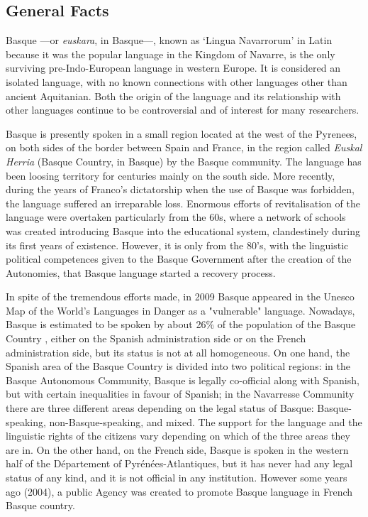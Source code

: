 \clearpage


\begin{multicols}{2}

\subsection{General Facts}
    Basque —or \textit{euskara}, in Basque—, known as ‘Lingua Navarrorum’ in Latin because it was the popular language in the Kingdom of Navarre, is the only surviving pre-Indo-European language in western Europe. It is considered an isolated language, with no known connections with other languages other than ancient Aquitanian. Both the origin of the language and its relationship with other languages continue to be controversial and of interest for many researchers.

Basque is presently spoken in a small region located at the west of the Pyrenees, on both sides of the border between Spain and France, in the region called \textit{Euskal Herria} (Basque Country, in Basque) by the Basque community.  The language has been loosing territory for centuries mainly on the south side. More recently, during the years of Franco’s dictatorship when the use of Basque was forbidden, the language suffered an irreparable loss. Enormous efforts of revitalisation of the language were overtaken particularly from the 60s, where a network of schools was created introducing Basque into the educational system, clandestinely during its first years of existence. However, it is only from the 80’s, with the linguistic political competences given to the Basque Government after the creation of the Autonomies, that Basque language started a recovery process. 

In spite of the tremendous efforts made, in 2009 Basque appeared in the Unesco Map of the World's Languages in Danger \cite{BAS-Nota5}  as a "vulnerable" language. Nowadays, Basque is estimated to be spoken by about 26\% of the population of the Basque Country  \cite{BAS-Nota6}, either on the Spanish administration side or on the French administration side, but its status is not at all homogeneous. On one hand, the Spanish area of the Basque Country is divided into two political regions: in the Basque Autonomous Community, Basque is legally co-official along with Spanish, but with certain inequalities in favour of Spanish; in the Navarresse Community there are three different areas depending on the legal status of Basque: Basque-speaking, non-Basque-speaking, and mixed. The support for the language and the linguistic rights of the citizens vary depending on which of the three areas they are in. On the other hand, on the French side, Basque is spoken in the western half of the Département of Pyrénées-Atlantiques, but it has never had any legal status of any kind, and it is not official in any institution. However some years ago (2004), a public Agency was created to promote Basque language in French Basque country.


\end{multicols}
